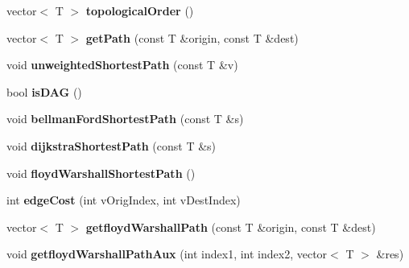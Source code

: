\begin{DoxyCompactItemize}
\item 
\hypertarget{class_graph_a2e75512c089c3916dda9cf61e1185d9d}{}vector$<$ T $>$ {\bfseries topological\+Order} ()\label{class_graph_a2e75512c089c3916dda9cf61e1185d9d}

\item 
\hypertarget{class_graph_ab4054ca572c10669dd3e05d6d41c116c}{}vector$<$ T $>$ {\bfseries get\+Path} (const T \&origin, const T \&dest)\label{class_graph_ab4054ca572c10669dd3e05d6d41c116c}

\item 
\hypertarget{class_graph_ae5264597aacaf4f45819e96a6d6c89aa}{}void {\bfseries unweighted\+Shortest\+Path} (const T \&v)\label{class_graph_ae5264597aacaf4f45819e96a6d6c89aa}

\item 
\hypertarget{class_graph_ab49d07c2bd6b8b30d5ae82bc558b821a}{}bool {\bfseries is\+D\+A\+G} ()\label{class_graph_ab49d07c2bd6b8b30d5ae82bc558b821a}

\item 
\hypertarget{class_graph_a1d6769b79beaa76f78fd9c9209833bef}{}void {\bfseries bellman\+Ford\+Shortest\+Path} (const T \&s)\label{class_graph_a1d6769b79beaa76f78fd9c9209833bef}

\item 
\hypertarget{class_graph_a445a38cf4045797198eae2b818b602de}{}void {\bfseries dijkstra\+Shortest\+Path} (const T \&s)\label{class_graph_a445a38cf4045797198eae2b818b602de}

\item 
\hypertarget{class_graph_ae5161f4408bf1ead2b29d19d67fb04ee}{}void {\bfseries floyd\+Warshall\+Shortest\+Path} ()\label{class_graph_ae5161f4408bf1ead2b29d19d67fb04ee}

\item 
\hypertarget{class_graph_a7e137f1ef838395ac1044a944fa54448}{}int {\bfseries edge\+Cost} (int v\+Orig\+Index, int v\+Dest\+Index)\label{class_graph_a7e137f1ef838395ac1044a944fa54448}

\item 
\hypertarget{class_graph_ab23d1dae92a7f2b29dcb91a94336674c}{}vector$<$ T $>$ {\bfseries getfloyd\+Warshall\+Path} (const T \&origin, const T \&dest)\label{class_graph_ab23d1dae92a7f2b29dcb91a94336674c}

\item 
\hypertarget{class_graph_aad1eda4beb8425d03ed1f3b8af397563}{}void {\bfseries getfloyd\+Warshall\+Path\+Aux} (int index1, int index2, vector$<$ T $>$ \&res)\label{class_graph_aad1eda4beb8425d03ed1f3b8af397563}


\end{DoxyCompactItemize}
